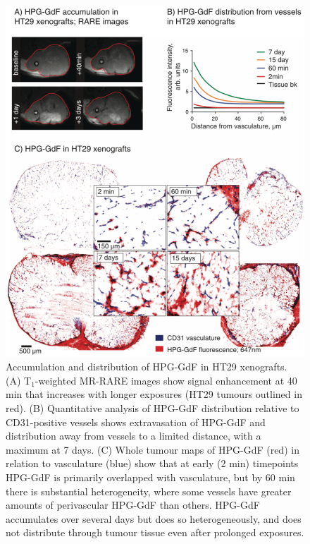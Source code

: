 \begin{figure}[htbp]
 \begin{center}
 \includegraphics[width=\textwidth]{hpg/hpg-paper1-images/hpg_fig3-hpgdistribution.png}
 \caption{Accumulation and distribution of \ac{HPG-GdF} in HT29 xenografts. (A) T$_1$-weighted MR-RARE images show signal enhancement at 40 min that increases with longer exposures (HT29 tumours outlined in red). (B) Quantitative analysis of \ac{HPG-GdF} distribution relative to CD31-positive vessels shows extravasation of \ac{HPG-GdF} and distribution away from vessels to a limited distance, with a maximum at 7 days. (C) Whole tumour maps of \ac{HPG-GdF} (red) in relation to vasculature (blue) show that at early (2 min) timepoints \ac{HPG-GdF} is primarily overlapped with vasculature, but by 60 min there is substantial heterogeneity, where some vessels have greater amounts of perivascular \ac{HPG-GdF} than others. \ac{HPG-GdF} accumulates over several days but does so heterogeneously, and does not distribute through tumour tissue even after prolonged exposures.}
 \label{hpgpaper1:fig3}
 \end{center}
\end{figure}

